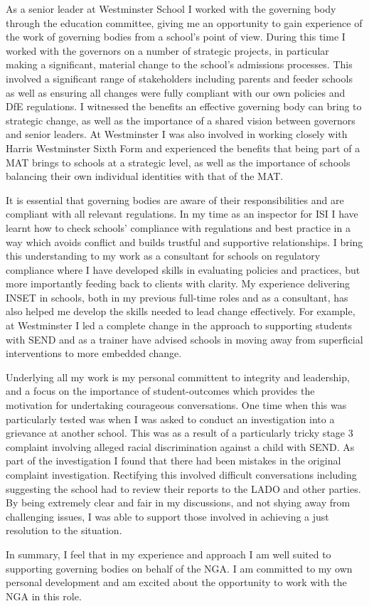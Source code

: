 As a senior leader at Westminster School I worked with the governing body through the education committee, giving me an opportunity to gain experience of the work of governing bodies from a school's point of view. During this time I worked with the governors on a number of strategic projects, in particular making a significant, material change to the school's admissions processes. This involved a significant range of stakeholders including parents and feeder schools as well as ensuring all changes were fully compliant with our own policies and DfE regulations. I witnessed the benefits an effective governing body can bring to strategic change, as well as the importance of a shared vision between governors and senior leaders. At Westminster I was also involved in working closely with Harris Westminster Sixth Form and experienced the benefits that being part of a MAT brings to schools at a strategic level, as well as the importance of schools balancing their own individual identities with that of the MAT. 

It is essential that governing bodies are aware of their responsibilities and are compliant with all relevant regulations. In my time as an inspector for ISI I have learnt how to check schools' compliance with regulations and best practice in a way which avoids conflict and builds trustful and supportive relationships. I bring this understanding to my work as a consultant for schools on regulatory compliance where I have developed skills in evaluating policies and practices, but more importantly feeding back to clients with clarity. My experience delivering INSET in schools, both in my previous full-time roles and as a consultant, has also helped me develop the skills needed to lead change effectively. For example, at Westminster I led a complete change in the approach to supporting students with SEND and as a trainer have advised schools in moving away from superficial interventions to more embedded change.

Underlying all my work is my personal committent to integrity and leadership, and a focus on the importance of student-outcomes which provides the motivation for undertaking courageous conversations. One time when this was particularly tested was when I was asked to conduct an investigation into a grievance at another school. This was as a result of a particularly tricky stage 3 complaint involving alleged racial discrimination against a child with SEND. As part of the investigation I found that there had been mistakes in the original complaint investigation. Rectifying this involved difficult conversations including suggesting the school had to review their reports to the LADO and other parties. By being extremely clear and fair in my discussions, and not shying away from challenging issues, I was able to support those involved in achieving a just resolution to the situation.

In summary, I feel that in my experience and approach I am well suited to supporting governing bodies on behalf of the NGA. I am committed to my own personal development and am excited about the opportunity to work with the NGA in this role.